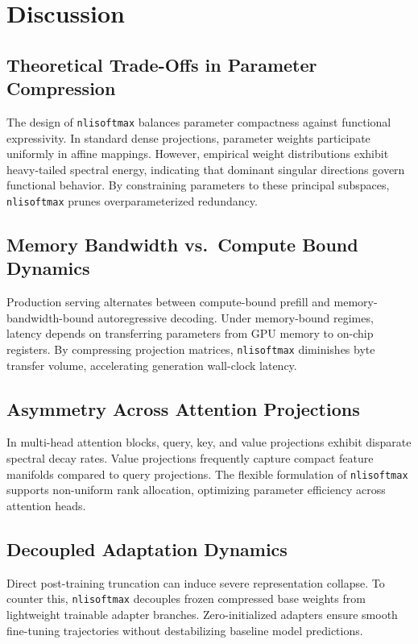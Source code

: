 \section{Discussion}

\subsection{Theoretical Trade-Offs in Parameter Compression}
The design of \texttt{nlisoftmax} balances parameter compactness against functional expressivity. In standard dense projections, parameter weights participate uniformly in affine mappings. However, empirical weight distributions exhibit heavy-tailed spectral energy, indicating that dominant singular directions govern functional behavior. By constraining parameters to these principal subspaces, \texttt{nlisoftmax} prunes overparameterized redundancy.

\subsection{Memory Bandwidth vs.\ Compute Bound Dynamics}
Production serving alternates between compute-bound prefill and memory-bandwidth-bound autoregressive decoding. Under memory-bound regimes, latency depends on transferring parameters from GPU memory to on-chip registers. By compressing projection matrices, \texttt{nlisoftmax} diminishes byte transfer volume, accelerating generation wall-clock latency.

\subsection{Asymmetry Across Attention Projections}
In multi-head attention blocks, query, key, and value projections exhibit disparate spectral decay rates. Value projections frequently capture compact feature manifolds compared to query projections. The flexible formulation of \texttt{nlisoftmax} supports non-uniform rank allocation, optimizing parameter efficiency across attention heads.

\subsection{Decoupled Adaptation Dynamics}
Direct post-training truncation can induce severe representation collapse. To counter this, \texttt{nlisoftmax} decouples frozen compressed base weights from lightweight trainable adapter branches. Zero-initialized adapters ensure smooth fine-tuning trajectories without destabilizing baseline model predictions.

